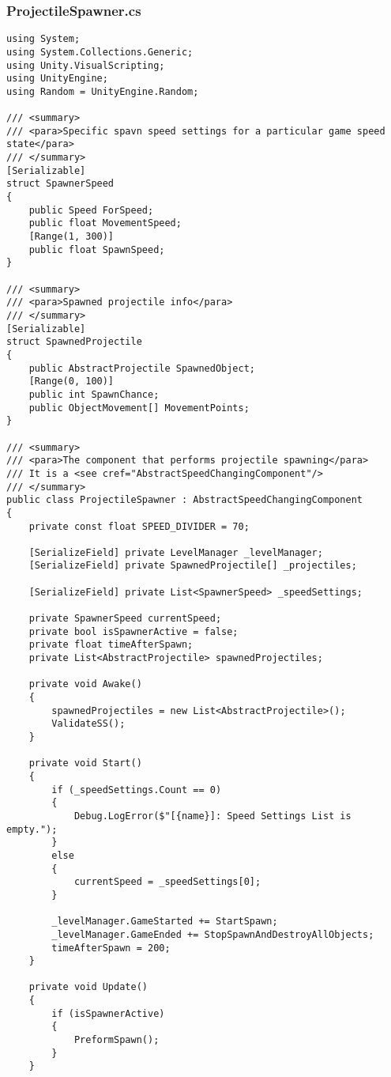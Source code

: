 \subsubsection*{ProjectileSpawner.cs}
\begin{verbatim}
using System;
using System.Collections.Generic;
using Unity.VisualScripting;
using UnityEngine;
using Random = UnityEngine.Random;

/// <summary>
/// <para>Specific spavn speed settings for a particular game speed state</para>
/// </summary>
[Serializable]
struct SpawnerSpeed
{
    public Speed ForSpeed;
    public float MovementSpeed;
    [Range(1, 300)] 
    public float SpawnSpeed;
}

/// <summary>
/// <para>Spawned projectile info</para>
/// </summary>
[Serializable]
struct SpawnedProjectile
{
    public AbstractProjectile SpawnedObject;
    [Range(0, 100)] 
    public int SpawnChance;
    public ObjectMovement[] MovementPoints;
}

/// <summary>
/// <para>The component that performs projectile spawning</para>
/// It is a <see cref="AbstractSpeedChangingComponent"/>
/// </summary>
public class ProjectileSpawner : AbstractSpeedChangingComponent
{
    private const float SPEED_DIVIDER = 70;

    [SerializeField] private LevelManager _levelManager;
    [SerializeField] private SpawnedProjectile[] _projectiles;

    [SerializeField] private List<SpawnerSpeed> _speedSettings;

    private SpawnerSpeed currentSpeed;
    private bool isSpawnerActive = false;
    private float timeAfterSpawn;
    private List<AbstractProjectile> spawnedProjectiles;

    private void Awake()
    {
        spawnedProjectiles = new List<AbstractProjectile>();
        ValidateSS();
    }

    private void Start()
    {
        if (_speedSettings.Count == 0)
        {
            Debug.LogError($"[{name}]: Speed Settings List is empty.");
        }
        else
        {
            currentSpeed = _speedSettings[0];
        }

        _levelManager.GameStarted += StartSpawn;
        _levelManager.GameEnded += StopSpawnAndDestroyAllObjects;
        timeAfterSpawn = 200;
    }

    private void Update()
    {
        if (isSpawnerActive)
        {
            PreformSpawn();
        }
    }


\end{verbatim}
